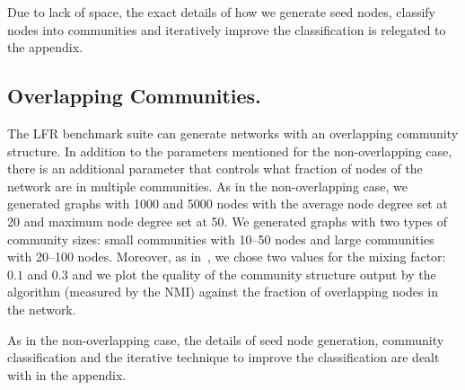 Due to lack of space, the exact details of how we generate seed nodes, classify nodes into 
communities and iteratively improve the classification is relegated to the appendix. 

\subsection{Overlapping Communities.}
The LFR benchmark suite can generate networks with an overlapping community structure. 
In addition to the parameters mentioned for the non-overlapping case, there is an additional 
parameter that controls what fraction of nodes of the network are in multiple communities. 
As in the non-overlapping case, we generated graphs with 1000 and 5000 nodes with the average
node degree set at 20 and maximum node degree set at 50. We generated graphs with two types 
of community sizes: small communities with 10--50 nodes and large communities with 20--100 nodes.
Moreover, as in~\cite{LF09}, we chose two values for the mixing factor: $0.1$ and $0.3$ 
and we plot the quality of the community structure output by the algorithm 
(measured by the NMI) against the fraction of overlapping nodes in the network.

As in the non-overlapping case, the details of seed node generation, community classification 
and the iterative technique to improve the classification are dealt with in the appendix.


